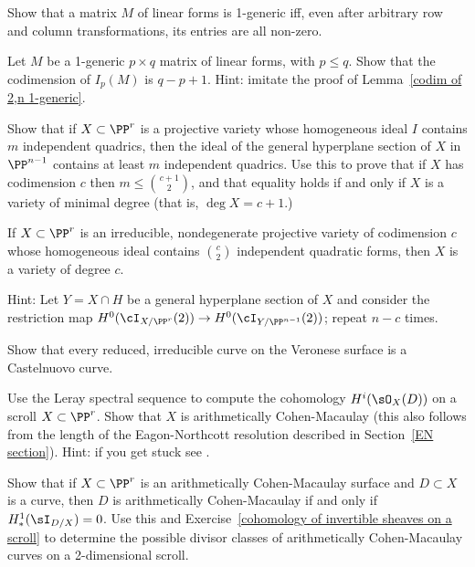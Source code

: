 \begin{exercise}
Show that a matrix $M$ of linear forms is 1-generic iff, even after arbitrary row and column transformations, its entries are all non-zero.
\end{exercise}

\begin{exercise}
Let $M$ be a 1-generic $p\times q$ matrix of linear forms, with $p\leq q$. Show that the codimension of
$I_p(M)$ is $q-p+1$. Hint: imitate the proof of Lemma~\ref{codim of 2,n 1-generic}.
\end{exercise}

\begin{exercise}
Show that if $X\subset \PP^r$ is a projective variety whose homogeneous ideal $I$ contains $m$ independent quadrics, then the ideal of the general hyperplane section of $X$ in $\PP^{n-1}$
contains at least $m$ independent quadrics. Use this to prove that if $X$ has codimension $c$ then $m\leq {c+1\choose 2}$, and that equality holds if and only if
$X$ is a variety of minimal degree (that is, $\deg X = c+1$.)
\end{exercise}

\begin{exercise}\label{many quadrics}
 If $X \subset \PP^r$ is an irreducible, nondegenerate projective variety of codimension $c$ whose homogeneous ideal
 contains ${c\choose 2}$ independent quadratic forms, then $X$ is a variety of degree $c$.
 
Hint: Let $Y = X \cap H$ be a general hyperplane section of $X$ and consider the restriction map $H^0(\cI_{X/\PP^r}(2)) \to H^0(\cI_{Y/\PP^{n-1}}(2))$; repeat $n-c$ times.
\end{exercise}

\begin{exercise}\label{Castelnuovo Veronese}
Show that every reduced, irreducible curve on the Veronese surface is a Castelnuovo curve.
\end{exercise}

\begin{exercise}\label{cohomology of invertible sheaves on a scroll}
Use the Leray spectral sequence to compute the cohomology $H^{i}(\sO_{X}(D))$ on a scroll $X\subset \PP^r$.
Show that $X$ is arithmetically Cohen-Macaulay (this also follows from the length of the Eagon-Northcott resolution
described in Section~\ref{EN section}).
Hint: if you get stuck see \cite[Section V.1]{Hartshorne1977}.
\end{exercise}

\begin{exercise}
 Show that if $X\subset\PP^r$ is an arithmetically Cohen-Macaulay surface
and $D\subset X$ is a curve, then $D$ is arithmetically Cohen-Macaulay if and only if
$H^1_*(\sI_{D/X}) = 0$. Use this and Exercise~\ref{cohomology of invertible sheaves on a scroll} to determine the
possible divisor classes of arithmetically Cohen-Macaulay curves on a 2-dimensional scroll.
\end{exercise}

